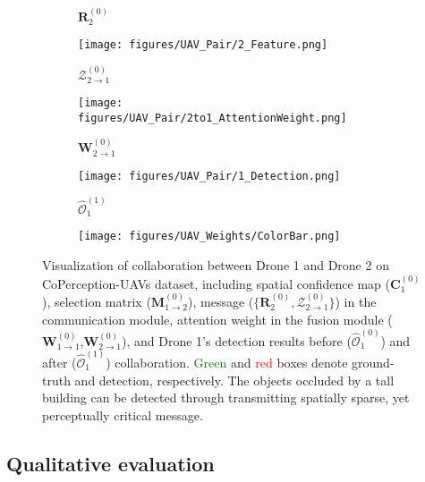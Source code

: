 \documentclass{article}
\begin{document}
\begin{figure}[!t]
\begin{subfigure}{0.18\linewidth}
    \caption{$\mathbf{R}_2^{(0)}$}
    \label{fig:UAV_RequestMap2}
  \end{subfigure}
  \begin{subfigure}{0.18\linewidth}
    \texttt{[image: figures/UAV\_Pair/2\_Feature.png]}
    \vspace{-5mm}
    \caption{$\mathcal{Z}_{2\rightarrow 1}^{(0)}$}
    \label{fig:UAV_Message2}
  \end{subfigure}
  \begin{subfigure}{0.18\linewidth}
    \texttt{[image: figures/UAV\_Pair/2to1\_AttentionWeight.png]}
    \vspace{-5mm}
    \caption{$\mathbf{W}_{2\rightarrow 1}^{(0)}$}
    \label{fig:UAV_AttenWeight2to1}
  \end{subfigure}
\begin{subfigure}{0.18\linewidth}
    \texttt{[image: figures/UAV\_Pair/1\_Detection.png]}
    \vspace{-5mm}
    \caption{$\widehat{\mathcal{O}}_{1}^{(1)}$}
    \label{fig:UAV_DetectionAfterComm}
  \end{subfigure}
  \begin{subfigure}{0.04\linewidth}
    \texttt{[image: figures/UAV\_Weights/ColorBar.png]}
\end{subfigure}
\vspace{-2mm}
  \caption{Visualization of collaboration between Drone 1 and Drone 2 on CoPerception-UAVs dataset, including spatial confidence map ($\mathbf{C}_1^{(0)}$), selection matrix ($\mathbf{M}_{1\rightarrow2}^{(0)}$), message ($\{\mathbf{R}_2^{(0)},\mathcal{Z}_{2\rightarrow1}^{(0)}\}$) in the communication module, attention weight in the fusion module ($\mathbf{W}_{1\rightarrow1}^{(0)}$,$\mathbf{W}_{2\rightarrow1}^{(0)}$), and Drone 1's detection results before ($\widehat{\mathcal{O}}_{1}^{(0)}$) and after ($\widehat{\mathcal{O}}_{1}^{(1)}$) collaboration. \textcolor{green}{Green} and \textcolor{red}{red} boxes denote ground-truth and detection, respectively. The objects occluded by a tall building can be detected through transmitting spatially sparse, yet perceptually critical message. }
  \label{fig:UAV_Weights}
  \vspace{-4mm}
\end{figure}

\vspace{-2mm}
\subsection{Qualitative evaluation}
\vspace{-2mm}
\end{document}
